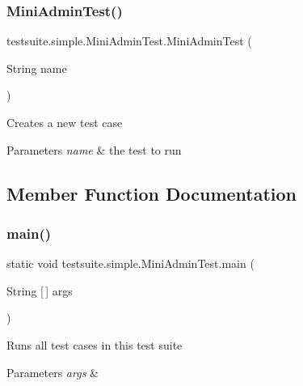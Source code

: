 \subsubsection{\texorpdfstring{Mini\+Admin\+Test()}{MiniAdminTest()}}
{\footnotesize\ttfamily testsuite.\+simple.\+Mini\+Admin\+Test.\+Mini\+Admin\+Test (\begin{DoxyParamCaption}\item[{String}]{name }\end{DoxyParamCaption})}

Creates a new test case


\begin{DoxyParams}{Parameters}
{\em name} & the test to run \\
\hline
\end{DoxyParams}


\subsection{Member Function Documentation}
\mbox{\label{classtestsuite_1_1simple_1_1_mini_admin_test_a8a37b0ac4e247a37872c7854f9a52ae7}} 
\subsubsection{\texorpdfstring{main()}{main()}}
{\footnotesize\ttfamily static void testsuite.\+simple.\+Mini\+Admin\+Test.\+main (\begin{DoxyParamCaption}\item[{String \mbox{[}$\,$\mbox{]}}]{args }\end{DoxyParamCaption})\hspace{0.3cm}{\ttfamily [static]}}

Runs all test cases in this test suite


\begin{DoxyParams}{Parameters}
{\em args} & \\
\hline
\end{DoxyParams}
\mbox{\label{classtestsuite_1_1simple_1_1_mini_admin_test_a8420a5f6bcd0ecfe1b716b8251899662}} 
